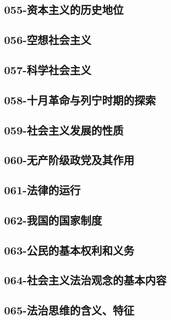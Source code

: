 \subsection{055-资本主义的历史地位}

\subsection{056-空想社会主义}

\subsection{057-科学社会主义}

\subsection{058-十月革命与列宁时期的探索}

\subsection{059-社会主义发展的性质}

\subsection{060-无产阶级政党及其作用}

\subsection{061-法律的运行}

\subsection{062-我国的国家制度}

\subsection{063-公民的基本权利和义务}

\subsection{064-社会主义法治观念的基本内容}

\subsection{065-法治思维的含义、特征}

